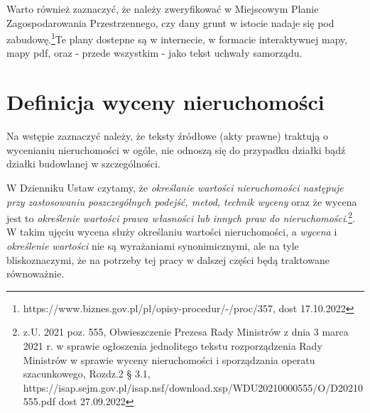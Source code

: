 \documentclass[a4paper,12pt,twoside,openany]{report}
\begin{document}
Warto również zaznaczyć, że należy zweryfikować w  Miejscowym Planie Zagospodarowania Przestrzennego, czy dany grunt w istocie nadaje się pod zabudowę.\footnote{https://www.biznes.gov.pl/pl/opisy-procedur/-/proc/357, dost 17.10.2022}Te plany dostepne są w internecie, w formacie interaktywnej mapy, mapy pdf, oraz - przede wszystkim - jako tekst uchwały samorządu. 


\section{Definicja wyceny nieruchomości}
 Na wstępie zaznaczyć należy, że teksty źródłowe (akty prawne) traktują  o wycenianiu nieruchomości w ogóle, nie odnoszą się do przypadku działki bądź działki budowlanej w szczególności.


W Dzienniku Ustaw czytamy, że \textit{określanie wartości nieruchomości następuje przy zastosowaniu poszczególnych podejść, metod, technik wyceny} oraz że wycena jest to \textit {określenie wartości prawa własności lub innych praw do nieruchomości}.\footnote{z.U. 2021 poz. 555, Obwieszczenie Prezesa Rady Ministrów z dnia 3 marca 2021 r. w sprawie ogłoszenia jednolitego tekstu rozporządzenia Rady Ministrów w sprawie wyceny nieruchomości i sporządzania operatu szacunkowego, Rozdz.2 § 3.1, https://isap.sejm.gov.pl/isap.nsf/download.xsp/WDU20210000555/O/D20210555.pdf dost 27.09.2022}. W takim ujęciu wycena służy określaniu wartości nieruchomości, a \textit{wycena} i \textit{określenie wartości} nie są wyrażaniami synonimicznymi, ale na tyle bliskoznaczymi, że na potrzeby tej pracy w dalszej części będą traktowane równoważnie.\\
\end{document}
